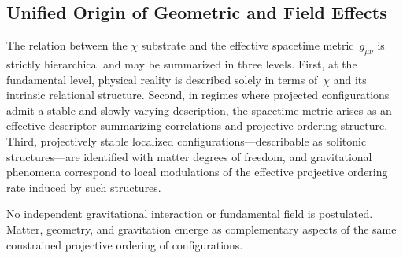 \subsection{Unified Origin of Geometric and Field Effects}
  \label{subsec:unified-origin}

  The relation between the $\chi$ substrate and the effective spacetime
  metric~$g_{\mu\nu}$ is strictly hierarchical and may be summarized in
  three levels.
  First, at the fundamental level, physical reality is described solely in
  terms of~$\chi$ and its intrinsic relational structure.
  Second, in regimes where projected configurations admit a stable and slowly
  varying description, the spacetime metric arises as an effective descriptor
  summarizing correlations and projective ordering structure.
  Third, projectively stable localized configurations---describable as
  solitonic structures---are identified with matter degrees of freedom, and
  gravitational phenomena correspond to local modulations of the effective
  projective ordering rate induced by such structures.

  No independent gravitational interaction or fundamental field is postulated.
  Matter, geometry, and gravitation emerge as complementary aspects of the
  same constrained projective ordering of configurations.
